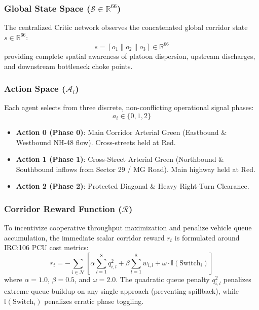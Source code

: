 \subsubsection{Global State Space ($\mathcal{S} \in \mathbb{R}^{66}$)}
The centralized Critic network observes the concatenated global corridor state $s \in \mathbb{R}^{66}$:
\begin{equation}
s = [o_1 \parallel o_2 \parallel o_3] \in \mathbb{R}^{66}
\end{equation}
providing complete spatial awareness of platoon dispersion, upstream discharges, and downstream bottleneck choke points.

\subsubsection{Action Space ($\mathcal{A}_i$)}
Each agent selects from three discrete, non-conflicting operational signal phases:
\begin{equation}
a_i \in \{0, 1, 2\}
\end{equation}
\begin{itemize}
    \item \textbf{Action 0 (Phase 0)}: Main Corridor Arterial Green (Eastbound \& Westbound NH-48 flow). Cross-streets held at Red.
    \item \textbf{Action 1 (Phase 1)}: Cross-Street Arterial Green (Northbound \& Southbound inflows from Sector 29 / MG Road). Main highway held at Red.
    \item \textbf{Action 2 (Phase 2)}: Protected Diagonal \& Heavy Right-Turn Clearance.
\end{itemize}

\subsubsection{Corridor Reward Function ($\mathcal{R}$)}
To incentivize cooperative throughput maximization and penalize vehicle queue accumulation, the immediate scalar corridor reward $r_t$ is formulated around IRC:106 PCU cost metrics:
\begin{equation}
r_t = - \sum_{i \in \mathcal{N}} \left[ \alpha \sum_{l=1}^8 q_{i,l}^2 + \beta \sum_{l=1}^8 w_{i,l} + \omega \cdot \mathbb{I}(\text{Switch}_i) \right]
\end{equation}
where $\alpha = 1.0$, $\beta = 0.5$, and $\omega = 2.0$. The quadratic queue penalty $q_{i,l}^2$ penalizes extreme queue buildup on any single approach (preventing spillback), while $\mathbb{I}(\text{Switch}_i)$ penalizes erratic phase toggling.

